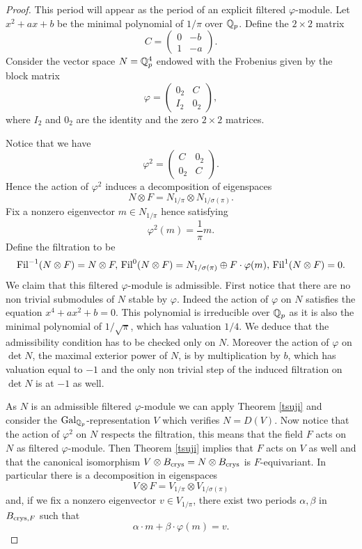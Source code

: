 \documentclass[11pt]{amsart}
\begin{document}
\begin{proof}
This period will appear as the period of an explicit filtered $\varphi$-module. Let $x^2+ax+b$ be the minimal polynomial of $1/\pi$ over $\mathbb{Q}_p$.  Define the $2 \times 2$ matrix
\[ 
C =  \begin{pmatrix} 0 & -b \\
1 & -a
 \end{pmatrix}.
 \]
 Consider the vector space  $N=\mathbb{Q}_p^4$  endowed with the Frobenius given by the block matrix
 \[ 
\varphi =  \begin{pmatrix} 0_2 & C \\
I_2 & 0_2
 \end{pmatrix},
 \]
where $I_2$ and $0_2$ are the identity and the zero $2 \times 2$  matrices.  

 Notice  that we have \[ 
\varphi^2 =  \begin{pmatrix} C & 0_2 \\
0_2 & C
 \end{pmatrix}.
 \]
 Hence the action of $\varphi^2$ induces a decomposition of eigenspaces
  \[N \otimes F=N_{1/\pi}\otimes N_{1/\sigma(\pi)}.\]
 Fix a nonzero eigenvector $m \in N_{1/\pi}$ hence satisfying
 \begin{equation}\label{troilo}  
\varphi^2 (m)=  \frac{1}{\pi} m.
 \end{equation}
Define the filtration to be \[\textnormal{Fil}^{-1} (N\otimes F)=N\otimes F, \, \textnormal{Fil}^0 (N\otimes F)= N_{1/\sigma(\pi)}\oplus F\cdot \varphi (m ) , \, \textnormal{Fil}^{1} (N\otimes F)=0.\] 
We claim that this filtered $\varphi$-module is admissible. First notice that there are no non trivial submodules of $N$ stable by $\varphi$. Indeed the action of $\varphi$ on $N$ satisfies the equation $x^4+ax^2+b=0$. This polynomial is irreducible over $\mathbb{Q}_p$ as it is also the minimal polynomial of $1/\sqrt{\pi}$, which has valuation $1/4$.
 We deduce that the admissibility condition has to be checked only on $N$. Moreover the action of $\varphi$ on $\det N$, the maximal exterior power of $N$, is by multiplication by $b$, which has valuation equal to $-1$ and the only non trivial step of the induced filtration on $\det N$ is at $-1$ as well.
 
As $N$ is an admissible filtered $\varphi$-module we can apply Theorem \ref{tsuji} and consider the $\textnormal{Gal}_{\mathbb{Q}_p}$-representation $V$ which verifies  $N=D(V)$. 
Now notice that the action of $\varphi^2$ on $N$ respects the filtration, this means that the field $F$ acts on $N$ as filtered $\varphi$-module. 
Then Theorem \ref{tsuji}  implies that
 $F$ acts on $V$ as well and that the canonical isomorphism  $V \otimes B_{\textnormal{crys}}= N \otimes B_{\textnormal{crys}}$ is $F$-equivariant. In particular there is a decomposition in eigenspaces  
 \[V \otimes F=V_{1/\pi}\otimes V_{1/\sigma(\pi)}\]
 and, if we fix  a nonzero eigenvector $v \in V_{1/\pi}$, there exist two periods $\alpha, \beta$ in $B_{\textnormal{crys},F}$ such that 
  \begin{equation}\label{troilo2}  
\alpha \cdot m+ \beta \cdot \varphi(m)=   v.
 \end{equation}
 

\end{proof}
\end{document}
